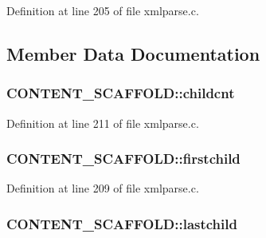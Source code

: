 Definition at line 205 of file xmlparse.\+c.



\subsection{Member Data Documentation}
\subsubsection[{\texorpdfstring{childcnt}{childcnt}}]{ C\+O\+N\+T\+E\+N\+T\+\_\+\+S\+C\+A\+F\+F\+O\+L\+D\+::childcnt}\hypertarget{struct_c_o_n_t_e_n_t___s_c_a_f_f_o_l_d_af731662d16220f07e1c2c54aa60e3178}{}\label{struct_c_o_n_t_e_n_t___s_c_a_f_f_o_l_d_af731662d16220f07e1c2c54aa60e3178}


Definition at line 211 of file xmlparse.\+c.

\subsubsection[{\texorpdfstring{firstchild}{firstchild}}]{ C\+O\+N\+T\+E\+N\+T\+\_\+\+S\+C\+A\+F\+F\+O\+L\+D\+::firstchild}\hypertarget{struct_c_o_n_t_e_n_t___s_c_a_f_f_o_l_d_a4d4dd5cd7f238ea8f49a00388725796d}{}\label{struct_c_o_n_t_e_n_t___s_c_a_f_f_o_l_d_a4d4dd5cd7f238ea8f49a00388725796d}


Definition at line 209 of file xmlparse.\+c.

\subsubsection[{\texorpdfstring{lastchild}{lastchild}}]{ C\+O\+N\+T\+E\+N\+T\+\_\+\+S\+C\+A\+F\+F\+O\+L\+D\+::lastchild}\hypertarget{struct_c_o_n_t_e_n_t___s_c_a_f_f_o_l_d_a2c79c02feb208f237546fe4ca74b7abe}{}\label{struct_c_o_n_t_e_n_t___s_c_a_f_f_o_l_d_a2c79c02feb208f237546fe4ca74b7abe}


